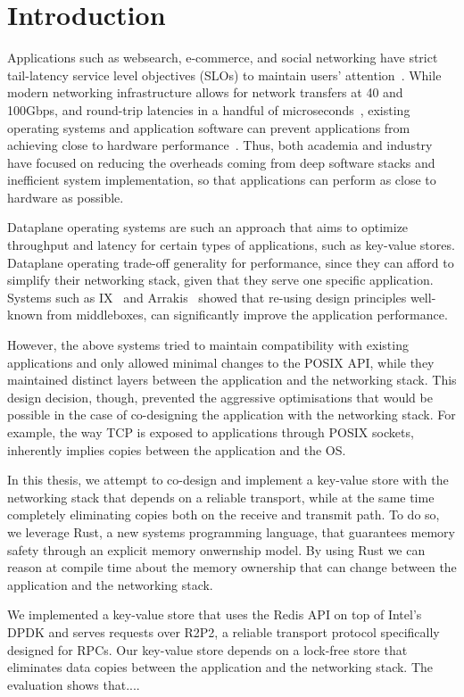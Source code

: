 \chapter{Introduction}

Applications such as websearch, e-commerce, and social networking have
strict tail-latency service level objectives (SLOs) to maintain users'
attention~\cite{url:attention}.
While modern networking infrastructure allows for network transfers at
40 and 100Gbps, and round-trip latencies in a handful of
microseconds~\cite{XXX}, existing operating systems and application
software can prevent applications from achieving close to hardware
performance~\cite{ix}.
Thus, both academia and industry have focused on reducing the
overheads coming from deep software stacks and inefficient system
implementation, so that applications can perform as close to hardware
as possible.

Dataplane operating systems are such an approach that aims to optimize
throughput and latency for certain types of applications, such as
key-value stores.
Dataplane operating trade-off generality for performance, since they
can afford to simplify their networking stack, given that they serve
one specific application.
Systems such as IX~\cite{ix} and Arrakis~\cite{arrakis} showed that
re-using design principles well-known from middleboxes, can
significantly improve the application performance.

However, the above systems tried to maintain compatibility with
existing applications and only allowed minimal changes to the POSIX
API, while they maintained distinct layers between the application and
the networking stack.
This design decision, though, prevented the aggressive optimisations
that would be possible in the case of co-designing the application
with the networking stack.
For example, the way TCP is exposed to applications through POSIX
sockets, inherently implies copies between the application and the
OS.

In this thesis, we attempt to co-design and implement a key-value
store with the networking stack that depends on a reliable transport,
while at the same time completely eliminating copies both on the
receive and transmit path.
To do so, we leverage Rust, a new systems programming language, that
guarantees memory safety through an explicit memory onwernship model.
By using Rust we can reason at compile time about the memory ownership
that can change between the application and the networking stack.

We implemented a key-value store that uses the Redis API on top of
Intel's DPDK and serves requests over R2P2, a reliable transport
protocol specifically designed for RPCs.
Our key-value store depends on a lock-free store that eliminates data
copies between the application and the networking stack.
The evaluation shows that....


